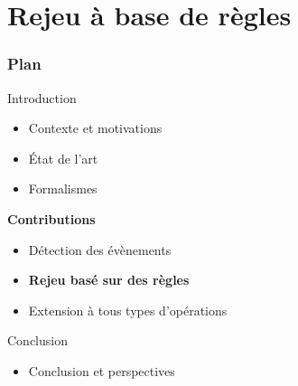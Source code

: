\documentclass[aspectratio=1610]{beamer}
\begin{document}
\section[Rejeu]{Rejeu à base de règles}
\begin{frame}
	\frametitle{Plan}
	\centering
	\begin{minipage}{\textwidth}
    \raggedright
  \begin{minipage}{.55\textwidth}
		\begin{mytocblock}{Introduction}
			\begin{itemize}
				\item[] Contexte et motivations
				\item[] État de l'art
				\item[] Formalismes
			\end{itemize}
		\end{mytocblock}
  \end{minipage}

  \vspace{1em}

  \begin{minipage}{.55\textwidth}
    \begin{mytocblock}{\textbf{Contributions}}
			\begin{itemize}
				\item[] Détection des évènements
				\item[] \textbf{Rejeu basé sur des règles}
				\item[] Extension à tous types d'opérations
			\end{itemize}
		\end{mytocblock}
  \end{minipage}

  \vspace{1em}

  \begin{minipage}{.55\textwidth}
    \begin{mytocblock}{Conclusion}
			\begin{itemize}
				\item[] Conclusion et perspectives
			\end{itemize}
		\end{mytocblock}
  \end{minipage}
\end{minipage}
\end{frame}

\end{document}
